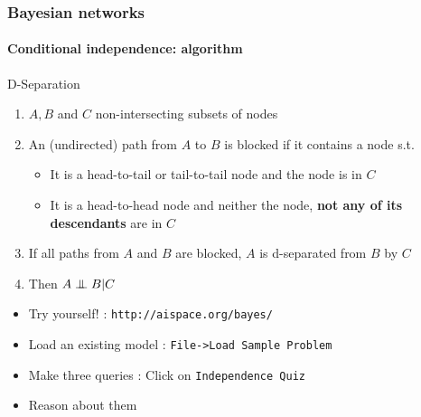 \documentclass[slidestop,compress,mathserif]{beamer}
\newcommand{\indep}{\ensuremath{\perp\mkern -10mu \perp}}
\begin{document}
\begin{frame}
	\frametitle{Bayesian networks}
	\framesubtitle{Conditional independence: algorithm}
    \vspace{-.5cm}
    \begin{block}{D-Separation}
    \begin{enumerate}
    \item $A,B$ and $C$ non-intersecting subsets of nodes
   \item An (undirected) path from $A$ to $B$ is blocked if it contains
    a node s.t.
    \begin{itemize}
    \item It is a head-to-tail or tail-to-tail node and
    the node is in $C$
    \item It is a head-to-head node and neither the node,
    \textbf{not any of its descendants} are in $C$
    \end{itemize}
    \item If all paths from $A$ and $B$ are blocked,
    $A$ is d-separated from $B$ by $C$
    \item Then $A \indep B | C$
    \end{enumerate}
    \end{block}
	\begin{itemize}
	\item Try yourself! : \texttt{http://aispace.org/bayes/}
	\item Load an existing model : \texttt{File->Load Sample Problem}
	\item Make three queries : Click on \texttt{Independence Quiz}
	\item Reason about them
	\end{itemize}
\end{frame}
\end{document}
